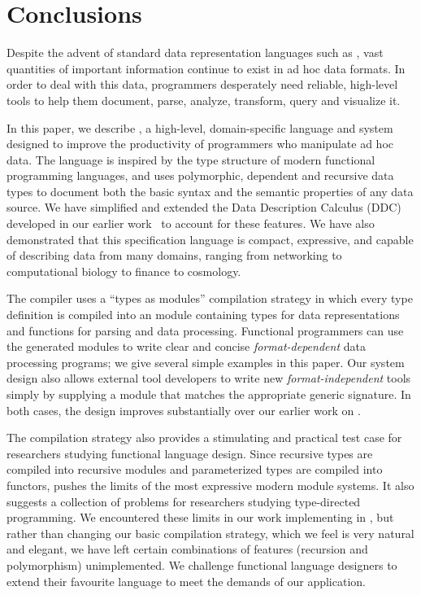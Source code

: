\section{Conclusions}
\label{sec:conc}

Despite the advent of standard data representation languages such as
\xml, vast quantities of important information continue to exist
in ad hoc data formats.  In order to deal with this data,
programmers desperately need reliable, high-level tools to 
help them document, parse, 
analyze, transform, query and visualize it.  

In this paper, we describe \padsml{}, 
a high-level, domain-specific language and system
designed to improve the productivity of programmers who 
manipulate ad hoc data.  The \padsml{} 
language is inspired by the type structure of modern functional
programming languages, and uses 
polymorphic, dependent and recursive data types to document both the
basic syntax and the semantic properties of any data source.  
We have simplified and extended the Data Description Calculus (DDC) 
developed in
our earlier work~\cite{fisher+:next700ddl} to account for these features.
We have also demonstrated that this specification language
is compact, expressive, and 
capable of describing data from many domains, ranging from
networking to computational biology to finance to cosmology.

The \padsml{} compiler uses a ``types as modules'' compilation strategy
in which every \padsml{} type definition is compiled into
an \ocaml{} module containing types for data representations
and functions for parsing and data processing.  Functional programmers
can use the generated modules to write clear and concise {\em format-dependent}
data processing programs;
we give several simple examples in this paper.  Our system design
also allows external
tool developers to write new {\em format-independent} tools
simply by supplying a module that matches the appropriate generic
signature.  In both cases, the design improves substantially over
our earlier work on \padsc{}.

The \padsml{} compilation strategy also provides a stimulating and
practical test case for researchers studying functional language
design.  Since recursive types are compiled into recursive modules and
parameterized types are compiled into functors, \padsml{} pushes the
limits of the most expressive modern module systems.  It also suggests
a collection of problems for researchers studying type-directed
programming.  We encountered these limits in our work implementing
\padsml{} in
\ocaml, but rather than changing
our basic compilation strategy, which we feel is very natural and elegant,
we have left certain combinations of features (recursion and polymorphism)
unimplemented.
We challenge functional language designers to extend their favourite
language to meet the demands of our application.


